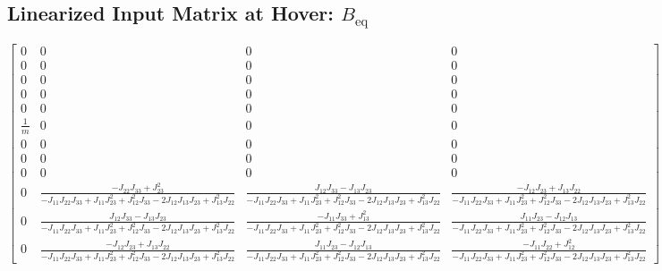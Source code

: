 \documentclass{article}
\begin{document}
\subsection*{Linearized Input Matrix at Hover: $B_{\text{eq}}$}
\[
\left[\begin{matrix}0 & 0 & 0 & 0\\0 & 0 & 0 & 0\\0 & 0 & 0 & 0\\0 & 0 & 0 & 0\\0 & 0 & 0 & 0\\\frac{1}{m} & 0 & 0 & 0\\0 & 0 & 0 & 0\\0 & 0 & 0 & 0\\0 & 0 & 0 & 0\\0 & \frac{- J_{22} J_{33} + J_{23}^{2}}{- J_{11} J_{22} J_{33} + J_{11} J_{23}^{2} + J_{12}^{2} J_{33} - 2 J_{12} J_{13} J_{23} + J_{13}^{2} J_{22}} & \frac{J_{12} J_{33} - J_{13} J_{23}}{- J_{11} J_{22} J_{33} + J_{11} J_{23}^{2} + J_{12}^{2} J_{33} - 2 J_{12} J_{13} J_{23} + J_{13}^{2} J_{22}} & \frac{- J_{12} J_{23} + J_{13} J_{22}}{- J_{11} J_{22} J_{33} + J_{11} J_{23}^{2} + J_{12}^{2} J_{33} - 2 J_{12} J_{13} J_{23} + J_{13}^{2} J_{22}}\\0 & \frac{J_{12} J_{33} - J_{13} J_{23}}{- J_{11} J_{22} J_{33} + J_{11} J_{23}^{2} + J_{12}^{2} J_{33} - 2 J_{12} J_{13} J_{23} + J_{13}^{2} J_{22}} & \frac{- J_{11} J_{33} + J_{13}^{2}}{- J_{11} J_{22} J_{33} + J_{11} J_{23}^{2} + J_{12}^{2} J_{33} - 2 J_{12} J_{13} J_{23} + J_{13}^{2} J_{22}} & \frac{J_{11} J_{23} - J_{12} J_{13}}{- J_{11} J_{22} J_{33} + J_{11} J_{23}^{2} + J_{12}^{2} J_{33} - 2 J_{12} J_{13} J_{23} + J_{13}^{2} J_{22}}\\0 & \frac{- J_{12} J_{23} + J_{13} J_{22}}{- J_{11} J_{22} J_{33} + J_{11} J_{23}^{2} + J_{12}^{2} J_{33} - 2 J_{12} J_{13} J_{23} + J_{13}^{2} J_{22}} & \frac{J_{11} J_{23} - J_{12} J_{13}}{- J_{11} J_{22} J_{33} + J_{11} J_{23}^{2} + J_{12}^{2} J_{33} - 2 J_{12} J_{13} J_{23} + J_{13}^{2} J_{22}} & \frac{- J_{11} J_{22} + J_{12}^{2}}{- J_{11} J_{22} J_{33} + J_{11} J_{23}^{2} + J_{12}^{2} J_{33} - 2 J_{12} J_{13} J_{23} + J_{13}^{2} J_{22}}\end{matrix}\right]
\]
\end{document}
